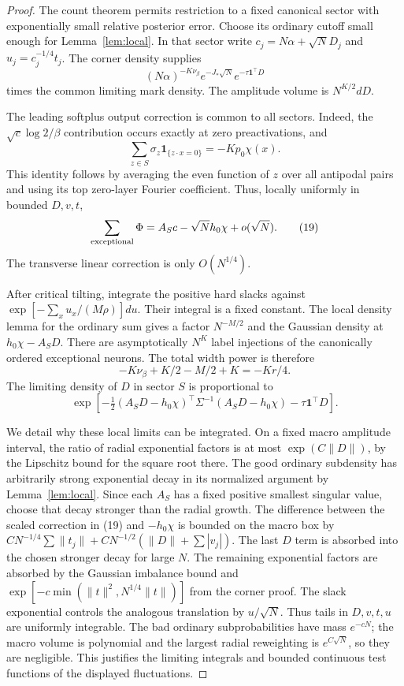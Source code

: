 \documentclass[11pt]{article}
\newcommand{\one}{\mathbf1}\newcommand{\TV}{\mathrm{TV}}
\begin{document}
\begin{proof}
The count theorem permits restriction to a fixed canonical sector with
exponentially small relative posterior error. Choose its ordinary cutoff
small enough for Lemma~\ref{lem:local}. In that sector write
$c_j=N\alpha+\sqrt N D_j$ and $u_j=c_j^{-1/4}t_j$.
The corner density supplies
\[
 (N\alpha)^{-K\nu_\beta}e^{-J_*\sqrt N}
       e^{-\tau\one^\top D}
\]
times the common limiting mark density. The amplitude volume is
$N^{K/2}dD$.

The leading softplus output correction is common to all sectors.
Indeed, the $\sqrt c\log2/\beta$ contribution occurs exactly at zero
preactivations, and
\[
 \sum_{z\in S}\sigma_z\one_{\{z\cdot x=0\}}=-Kp_0\chi(x).
 \tag{18}
\]
This identity follows by averaging the even function of $z$ over all
antipodal pairs and using its top zero-layer Fourier coefficient.
Thus, locally uniformly in bounded $D,v,t$,
\[
            \sum_{\rm exceptional}\Phi
                 =A_Sc-\sqrt N h_0\chi+o(\sqrt N).       \tag{19}
\]
The transverse linear correction is only $O(N^{1/4})$.

After critical tilting, integrate the positive hard slacks against
$\exp[-\sum_xu_x/(M\rho)]du$. Their integral is a fixed constant.
The local density lemma for the ordinary sum gives a factor
$N^{-M/2}$ and the Gaussian density at $h_0\chi-A_SD$.
There are asymptotically $N^K$ label injections of the canonically ordered
exceptional neurons. The total width power is therefore
\[
       -K\nu_\beta+K/2-M/2+K=-Kr/4.                   \tag{20}
\]
The limiting density of $D$ in sector $S$ is proportional to
\[
 \exp\left[-\tfrac12(A_SD-h_0\chi)^\top\Sigma^{-1}
                  (A_SD-h_0\chi)-\tau\one^\top D\right]. \tag{21}
\]

We detail why these local limits can be integrated. On a fixed macro
amplitude interval, the ratio of radial exponential factors is at most
$\exp(C\|D\|)$, by the Lipschitz bound for the square root there.
The good ordinary subdensity has arbitrarily strong exponential decay
in its normalized argument by Lemma~\ref{lem:local}. Since each $A_S$
has a fixed positive smallest singular value, choose that decay stronger
than the radial growth. The difference between the scaled correction in
(19) and $-h_0\chi$ is bounded on the macro box by
$C N^{-1/4}\sum\|t_j\|+C N^{-1/2}(\|D\|+\sum|v_j|)$.
The last $D$ term is absorbed into the chosen stronger decay for large
$N$. The remaining exponential factors are
absorbed by the Gaussian imbalance bound and
$\exp[-c\min(\|t\|^2,N^{1/4}\|t\|)]$ from the corner proof.
The slack exponential controls the analogous translation by $u/\sqrt N$.
Thus tails in $D,v,t,u$ are uniformly integrable. The bad ordinary
subprobabilities have mass $e^{-cN}$; the macro volume is polynomial and
the largest radial reweighting is $e^{C\sqrt N}$, so they are negligible.
This justifies the limiting integrals and bounded continuous test
functions of the displayed fluctuations.


\end{proof}
\end{document}
